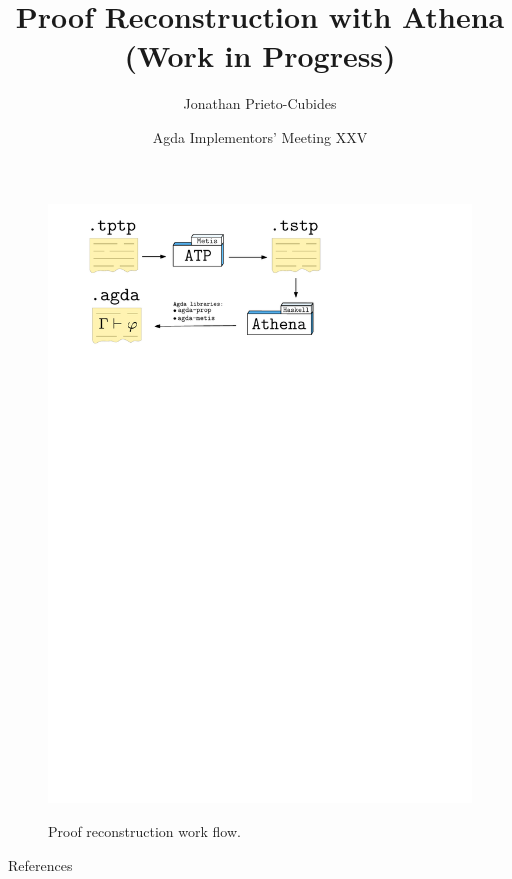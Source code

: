 \documentclass[hyperref={pdfpagelabels=false}]{beamer}
\title{Proof Reconstruction with Athena\\(Work in Progress)}
\date{Agda Implementors’ Meeting XXV}
\author{Jonathan Prieto-Cubides}
\institute{
Advisor: Andr\'es Sicard-Ram\'irez\\[3mm]
EAFIT University\\
Medell\'in, Colombia}
\begin{document}
\setcounter{page}{1}
\maketitle


\begin{frame}
\begin{figure}
\includegraphics[scale=0.85]{diagram.pdf}
\label{im:athena}
\caption{Proof reconstruction work flow.}
\end{figure}
\end{frame}



\begin{frame}{References}

\end{frame}
\end{document}

